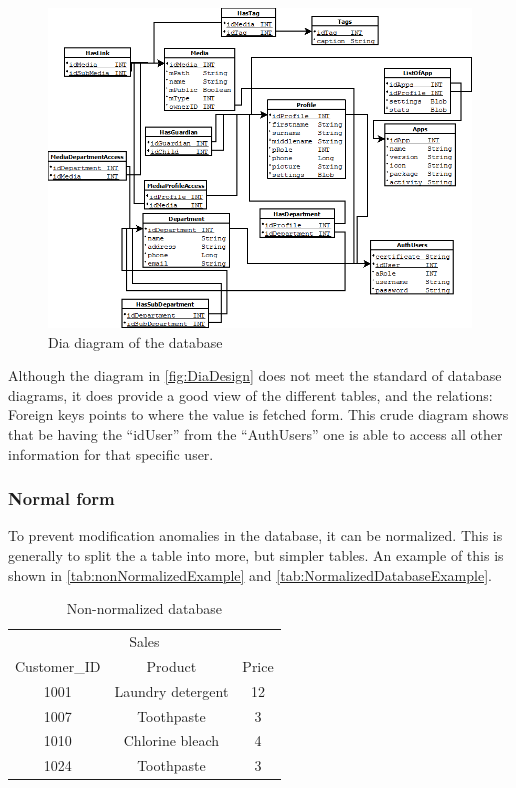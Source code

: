 \begin{figure}[htbp]
	\centering
		\includegraphics[width=1.00\textwidth]{images/DiaDesign.png}
	\caption{Dia diagram of the database}
	\label{fig:DiaDesign}
\end{figure}

Although the diagram in \autoref{fig:DiaDesign} does not meet the standard of database diagrams, it does provide a good view of the different tables, and the relations: Foreign keys points to where the value is fetched form. This crude diagram shows that be having the ``idUser'' from the ``AuthUsers'' one is able to access all other information for that specific user.

\subsubsection{Normal form}
To prevent modification anomalies in the database, it can be normalized. This is generally to split the a table into more, but simpler tables. An example of this is shown in \autoref{tab:nonNormalizedExample} and \autoref{tab:NormalizedDatabaseExample}.

\begin{table}[htbp]
	\centering
		\begin{tabular}{|c|c|c|}
		\hline
		 \multicolumn{3}{|c|}{Sales}\\
		\multicolumn{1}{|c}{Customer\_ID} & \multicolumn{1}{c}{Product} & \multicolumn{1}{c|}{Price} \\
		\hline
		1001 & Laundry detergent & 12 \\ \hline
		1007 & Toothpaste & 3 \\ \hline
		1010 & Chlorine bleach & 4 \\ \hline
		1024 & Toothpaste & 3\\	\hline
		\end{tabular}
	\caption{Non-normalized database\cite[p. 114]{sqlForDummies}}
	\label{tab:nonNormalizedExample}
\end{table}

